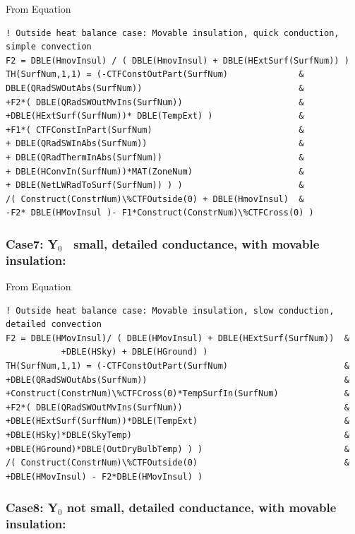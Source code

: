 From Equation

\begin{lstlisting}
! Outside heat balance case: Movable insulation, quick conduction, simple convection
F2 = DBLE(HmovInsul) / ( DBLE(HmovInsul) + DBLE(HExtSurf(SurfNum)) )
TH(SurfNum,1,1) = (-CTFConstOutPart(SurfNum)              &
DBLE(QRadSWOutAbs(SurfNum))                               &
+F2*( DBLE(QRadSWOutMvIns(SurfNum))                       &
+DBLE(HExtSurf(SurfNum))* DBLE(TempExt) )                 &
+F1*( CTFConstInPart(SurfNum)                             &
+ DBLE(QRadSWInAbs(SurfNum))                              &
+ DBLE(QRadThermInAbs(SurfNum))                           &
+ DBLE(HConvIn(SurfNum))*MAT(ZoneNum)                     &
+ DBLE(NetLWRadToSurf(SurfNum)) ) )                       &
/( Construct(ConstrNum)\%CTFOutside(0) + DBLE(HmovInsul)  &
-F2* DBLE(HMovInsul )- F1*Construct(ConstrNum)\%CTFCross(0) )
\end{lstlisting}

\subsubsection{\texorpdfstring{Case7: Y\(_{0}\)~ small, detailed conductance, with movable insulation:}{Case7: Y\_\{0\}~ small, detailed conductance, with movable insulation:}}\label{case7-yux5f0-small-detailed-conductance-with-movable-insulation-1}

From Equation

\begin{lstlisting}
! Outside heat balance case: Movable insulation, slow conduction, detailed convection
F2 = DBLE(HMovInsul)/ ( DBLE(HMovInsul) + DBLE(HExtSurf(SurfNum))  &
           +DBLE(HSky) + DBLE(HGround) )
TH(SurfNum,1,1) = (-CTFConstOutPart(SurfNum)                       &
+DBLE(QRadSWOutAbs(SurfNum))                                       &
+Construct(ConstrNum)\%CTFCross(0)*TempSurfIn(SurfNum)             &
+F2*( DBLE(QRadSWOutMvIns(SurfNum))                                &
+DBLE(HExtSurf(SurfNum))*DBLE(TempExt)                             &
+DBLE(HSky)*DBLE(SkyTemp)                                          &
+DBLE(HGround)*DBLE(OutDryBulbTemp) ) )                            &
/( Construct(ConstrNum)\%CTFOutside(0)                             &
+DBLE(HMovInsul) - F2*DBLE(HMovInsul) )
\end{lstlisting}

\subsubsection{\texorpdfstring{Case8: Y\(_{0}\) not small, detailed conductance, with movable insulation:}{Case8: Y\_\{0\} not small, detailed conductance, with movable insulation:}}\label{case8-yux5f0-not-small-detailed-conductance-with-movable-insulation-1}

